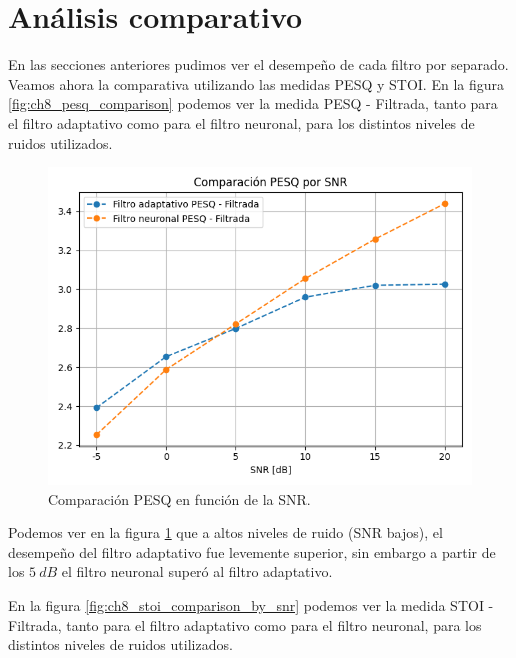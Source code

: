 \section{Análisis comparativo}

En las secciones anteriores pudimos ver el desempeño de cada filtro por separado. Veamos ahora la comparativa utilizando las medidas PESQ y STOI. En la figura \ref{fig:ch8_pesq_comparison} podemos ver la medida PESQ - Filtrada, tanto para el filtro adaptativo como para el filtro neuronal, para los distintos niveles de ruidos utilizados.

\begin{figure}[h]
	\centering
	\centerline{\includegraphics[scale=0.75]{images/ch8/comparison_pesq_by_snr.png}}
	\caption{Comparación PESQ en función de la SNR.}
	\label{fig:ch8_pesq_comparison_by_snr}
\end{figure}

Podemos ver en la figura \ref{fig:ch8_pesq_comparison_by_snr} que a altos niveles de ruido (SNR bajos), el desempeño del filtro adaptativo fue levemente superior, sin embargo a partir de los $\SI{5}{dB}$ el filtro neuronal superó al filtro adaptativo.	

En la figura \ref{fig:ch8_stoi_comparison_by_snr} podemos ver la medida STOI - Filtrada, tanto para el filtro adaptativo como para el filtro neuronal, para los distintos niveles de ruidos utilizados.

